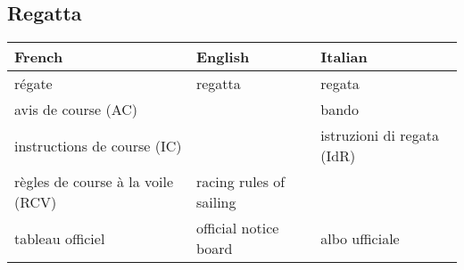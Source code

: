 \documentclass[a4paper, 12pt, twoside]{article}
\begin{document}
    \begin{indt}{\section{Regatta}} %
        \begin{tabular}{|l|l|l|}
            \hline %
            \textbf{French}
            & \textbf{English}
            & \textbf{Italian}
            \\
            \hline
            \hline %
            régate %
            & regatta
            & regata
            \\
            \hline %
            avis de course (AC) %
            &
            & bando
            \\
            \hline %
            instructions de course (IC) %
            &
            & istruzioni di regata (IdR)
            \\
            \hline %
            règles de course à la voile (RCV) %
            & racing rules of sailing
            &
            \\
            \hline %
            tableau officiel %
            & official notice board
            & albo ufficiale
            \\
            \hline %
        \end{tabular}
    \end{indt} %
\end{document}
